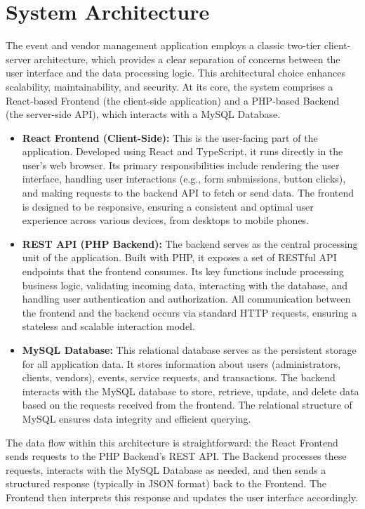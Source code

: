 \documentclass{report}
\begin{document}
\section{System Architecture}
\label{sec:system_architecture}
The event and vendor management application employs a classic two-tier client-server architecture, which provides a clear separation of concerns between the user interface and the data processing logic. This architectural choice enhances scalability, maintainability, and security. At its core, the system comprises a React-based Frontend (the client-side application) and a PHP-based Backend (the server-side API), which interacts with a MySQL Database.
\begin{itemize}
    \item \textbf{React Frontend (Client-Side):} This is the user-facing part of the application. Developed using React and TypeScript, it runs directly in the user's web browser. Its primary responsibilities include rendering the user interface, handling user interactions (e.g., form submissions, button clicks), and making requests to the backend API to fetch or send data. The frontend is designed to be responsive, ensuring a consistent and optimal user experience across various devices, from desktops to mobile phones.
    \item \textbf{REST API (PHP Backend):} The backend serves as the central processing unit of the application. Built with PHP, it exposes a set of RESTful API endpoints that the frontend consumes. Its key functions include processing business logic, validating incoming data, interacting with the database, and handling user authentication and authorization. All communication between the frontend and the backend occurs via standard HTTP requests, ensuring a stateless and scalable interaction model.
    \item \textbf{MySQL Database:} This relational database serves as the persistent storage for all application data. It stores information about users (administrators, clients, vendors), events, service requests, and transactions. The backend interacts with the MySQL database to store, retrieve, update, and delete data based on the requests received from the frontend. The relational structure of MySQL ensures data integrity and efficient querying.
\end{itemize}
The data flow within this architecture is straightforward: the React Frontend sends requests to the PHP Backend's REST API. The Backend processes these requests, interacts with the MySQL Database as needed, and then sends a structured response (typically in JSON format) back to the Frontend. The Frontend then interprets this response and updates the user interface accordingly.
\end{document}
